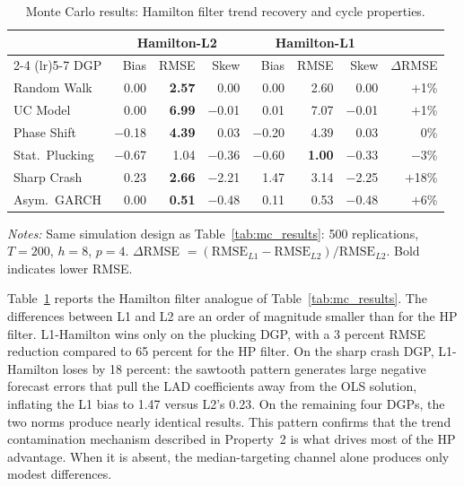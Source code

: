 \documentclass[10pt]{article}
\begin{document}
\begin{table}[htbp]
\centering
\caption{Monte Carlo results: Hamilton filter trend recovery and cycle properties.}
\label{tab:mc_hamilton}
\begin{tabular}{l rrr rrr r}
\toprule
& \multicolumn{3}{c}{Hamilton-L2} & \multicolumn{3}{c}{Hamilton-L1} & \\
\cmidrule(lr){2-4} \cmidrule(lr){5-7}
DGP & Bias & RMSE & Skew & Bias & RMSE & Skew & $\Delta$RMSE \\
\midrule
Random Walk        &    0.00 & \textbf{2.57} &    0.00 &    0.00 & 2.60 &    0.00 & $+$1\%  \\
UC Model           &    0.00 & \textbf{6.99} & $-$0.01 &    0.01 & 7.07 & $-$0.01 & $+$1\%  \\
Phase Shift        & $-$0.18 & \textbf{4.39} &    0.03 & $-$0.20 & 4.39 &    0.03 &    0\%  \\
\midrule
Stat.\ Plucking   & $-$0.67 & 1.04 & $-$0.36 & $-$0.60 & \textbf{1.00} & $-$0.33 & $-$3\%  \\
Sharp Crash        &    0.23 & \textbf{2.66} & $-$2.21 &    1.47 & 3.14 & $-$2.25 & $+$18\% \\
Asym.\ GARCH       &    0.00 & \textbf{0.51} & $-$0.48 &    0.11 & 0.53 & $-$0.48 & $+$6\%  \\
\bottomrule
\end{tabular}
\begin{tablenotes}
\small
\item \textit{Notes:} Same simulation design as Table~\ref{tab:mc_results}: 500 replications, $T = 200$, $h = 8$, $p = 4$. $\Delta$RMSE $= (\text{RMSE}_{L1} - \text{RMSE}_{L2}) / \text{RMSE}_{L2}$. Bold indicates lower RMSE.
\end{tablenotes}
\end{table}

Table~\ref{tab:mc_hamilton} reports the Hamilton filter analogue of Table~\ref{tab:mc_results}. The differences between L1 and L2 are an order of magnitude smaller than for the HP filter. L1-Hamilton wins only on the plucking DGP, with a 3 percent RMSE reduction compared to 65 percent for the HP filter. On the sharp crash DGP, L1-Hamilton loses by 18 percent: the sawtooth pattern generates large negative forecast errors that pull the LAD coefficients away from the OLS solution, inflating the L1 bias to 1.47 versus L2's 0.23. On the remaining four DGPs, the two norms produce nearly identical results. This pattern confirms that the trend contamination mechanism described in Property~2 is what drives most of the HP advantage. When it is absent, the median-targeting channel alone produces only modest differences.
\end{document}
